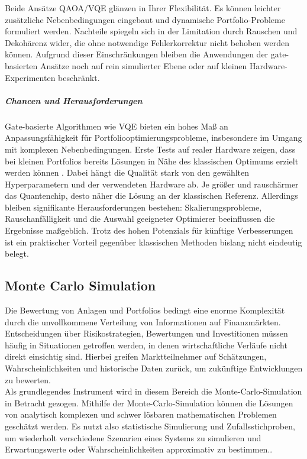 Beide Ansätze QAOA/VQE glänzen in Ihrer Flexibilität. Es können leichter zusätzliche Nebenbedingungen eingebaut und dynamische Portfolio-Probleme formuliert werden. Nachteile spiegeln sich in der Limitation durch Rauschen und Dekohärenz wider, die ohne notwendige Fehlerkorrektur nicht behoben werden können. Aufgrund dieser Einschränkungen bleiben die Anwendungen der gate-basierten Ansätze noch auf rein simulierter Ebene oder auf kleinen Hardware-Experimenten beschränkt.

\subparagraph{Chancen und Herausforderungen}

Gate-basierte Algorithmen wie VQE bieten ein hohes Maß an Anpassungsfähigkeit für Portfoliooptimierungsprobleme, insbesondere im Umgang mit komplexen Nebenbedingungen. Erste Tests auf realer Hardware zeigen, dass bei kleinen Portfolios bereits Lösungen in Nähe des klassischen Optimums erzielt werden können \cite[S. 2–4]{buonaiuto_best_2023}. Dabei hängt die Qualität stark von den gewählten Hyperparametern und der verwendeten Hardware ab. Je größer und rauschärmer das Quantenchip, desto näher die Lösung an der klassischen Referenz. Allerdings bleiben signifikante Herausforderungen bestehen: Skalierungsprobleme, Rauschanfälligkeit und die Auswahl geeigneter Optimierer beeinflussen die Ergebnisse maßgeblich. Trotz des hohen Potenzials für künftige Verbesserungen ist ein praktischer Vorteil gegenüber klassischen Methoden bislang nicht eindeutig belegt.

\subsection{ Monte Carlo Simulation}

Die Bewertung von Anlagen und Portfolios bedingt eine enorme Komplexität durch die
unvollkommene Verteilung von Informationen auf Finanzmärkten. Entscheidungen über Risikostrategien, Bewertungen und Investitionen müssen häufig in Situationen getroffen werden, in denen wirtschaftliche Verläufe nicht direkt einsichtig sind. Hierbei greifen Marktteilnehmer auf Schätzungen, Wahrscheinlichkeiten und historische Daten zurück, um zukünftige Entwicklungen zu bewerten. 
\\
 Als grundlegendes Instrument wird in diesem Bereich die Monte-Carlo-Simulation in Betracht gezogen. Mithilfe der Monte-Carlo-Simulation können die Lösungen von analytisch komplexen und schwer lösbaren mathematischen Problemen geschätzt werden. Es nutzt also statistische Simulierung und Zufallsstichproben, um wiederholt verschiedene Szenarien eines Systems zu simulieren und Erwartungswerte oder Wahrscheinlichkeiten approximativ zu bestimmen.\cite{orus_quantum_2019}.
 

